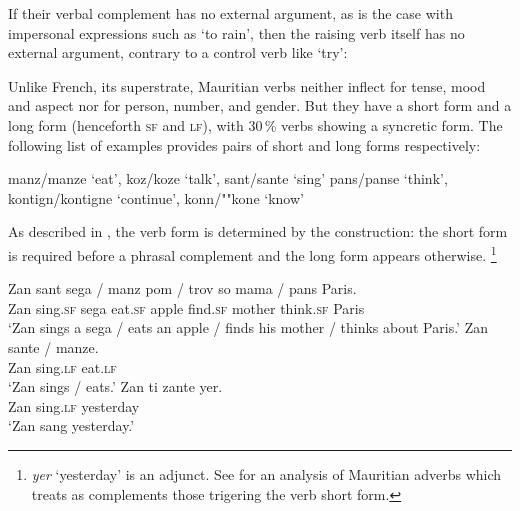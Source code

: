 \documentclass[output=paper
                ,modfonts
                ,nonflat
	        ,collection
	        ,collectionchapter
	        ,collectiontoclongg
 	        ,biblatex
                ,babelshorthands
                ,newtxmath
                ,draftmode
                ,colorlinks, citecolor=brown
]{./langsci/langscibook}
\begin{document}
\eal
{}
\zl
 
If their verbal complement has no external argument, as is the case with impersonal expressions such as  `to rain', then the raising verb itself has no external argument, contrary to a control verb like  `try':

\eal
{}
\zl

Unlike French, its superstrate, Mauritian verbs neither inflect for tense, mood and aspect nor for person, number, and
gender. But they have a short form and a long form (henceforth \textsc{sf} and \textsc{lf}), with
30\,\% verbs showing a syncretic form. The following list of examples provides pairs of short and
long forms respectively:

\eal
\ex manz/manze `eat', koz/koze `talk', sant/sante `sing'
\ex pans/panse `think', kontign/kontigne `continue', konn/""kone `know'
\zl

As described in \citet{Henri2010}, the verb form is determined by the construction: the short form is required before a phrasal complement and the long form appears otherwise. \footnote{\textit{yer} `yesterday' is an adjunct. See  for an analysis of Mauritian adverbs which treats as complements those trigering the verb short form.}


\begin{exe}
\ex \begin{xlist}
\ex 
\gll Zan sant sega / manz pom / trov so mama / pans Paris. \\
     Zan sing.\textsc{sf} sega {} eat.\textsc{sf} apple {} find.\textsc{sf} \POSS{} mother {} think.\textsc{sf} Paris \\
\glt `Zan sings a sega / eats an apple / finds his mother / thinks about Paris.'	
\ex 
\gll Zan sante / manze.\\
     Zan sing.\textsc{lf} {} eat.\textsc{lf}\\
\glt `Zan sings / eats.'
\ex 
\gll Zan ti zante yer. \\
Zan  \PRF{} sing.\textsc{lf} yesterday\\
\glt `Zan sang yesterday.'
\end{xlist}
\end{exe}
\end{document}
